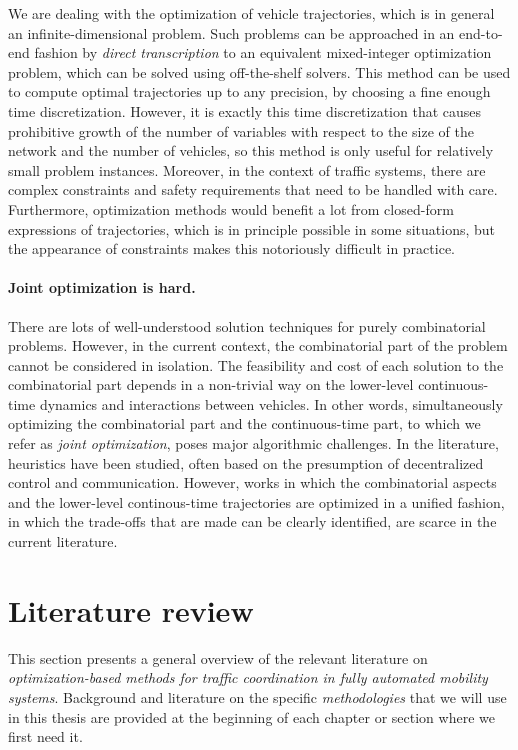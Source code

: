 \documentclass[a4paper]{report}
\theoremstyle{definition}
\theoremstyle{plain}
\begin{document}
We are dealing with the optimization of vehicle trajectories, which is in
general an infinite-dimensional problem.
%
Such problems can be approached in an end-to-end fashion by
\textit{direct transcription} to an equivalent mixed-integer optimization
problem, which can be solved using off-the-shelf solvers. This method can be
used to compute optimal trajectories up to any precision, by choosing a fine
enough time discretization. However, it is exactly this time discretization that
causes prohibitive growth of the number of variables with respect to the size of
the network and the number of vehicles, so this method is only useful for
relatively small problem instances.
%
Moreover, in the context of traffic systems, there are complex constraints and
safety requirements that need to be handled with care.
%
Furthermore, optimization methods would benefit a lot from closed-form
expressions of trajectories, which is in principle possible in some situations,
but the appearance of constraints makes this notoriously difficult in practice.


\paragraph{Joint optimization is hard.}

There are lots of well-understood solution techniques for purely combinatorial
problems.
%
However, in the current context, the combinatorial part of the problem cannot be
considered in isolation. The feasibility and cost of each solution to the
combinatorial part depends in a non-trivial way on the lower-level
continuous-time dynamics and interactions between vehicles.
%
In other words, simultaneously optimizing the combinatorial part and the
continuous-time part, to which we refer as \emph{joint optimization}, poses
major algorithmic challenges.
%
In the literature, heuristics have been studied, often based on the presumption
of decentralized control and communication.
%
However, works in which the combinatorial aspects and the lower-level
continous-time trajectories are optimized in a unified fashion, in which the
trade-offs that are made can be clearly identified, are scarce in the current
literature.

\section{Literature review}
This section presents a general overview of the relevant literature on
\emph{optimization-based methods for traffic coordination in fully automated
  mobility systems}. Background and literature on the specific
\emph{methodologies} that we will use in this thesis are provided at the
beginning of each chapter or section where we first need it.
\end{document}
